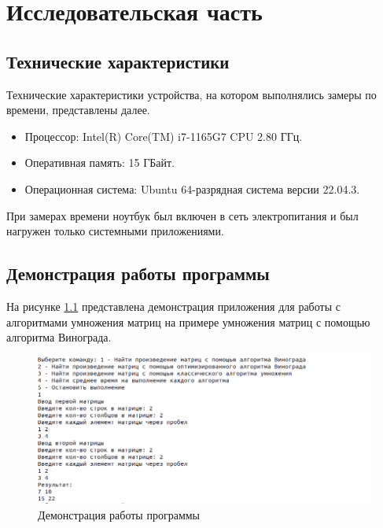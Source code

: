 \chapter{Исследовательская часть}

\section{Технические характеристики}

Технические характеристики устройства, на котором выполнялись замеры по времени, представлены далее.

\begin{itemize}
	\item Процессор: Intel(R) Core(TM) i7-1165G7 CPU 2.80 ГГц.
	\item Оперативная память: 15 ГБайт.
	\item Операционная система: Ubuntu 64-разрядная система версии 22.04.3.
\end{itemize}

При замерах времени ноутбук был включен в сеть электропитания и был нагружен только системными приложениями.

\clearpage

\section{Демонстрация работы программы}

На рисунке \ref{img:demonstration} представлена демонстрация приложения для работы с алгоритмами умножения матриц на примере умножения матриц с помощью алгоритма Винограда.

\begin{figure}[h]
	\centering
	\includegraphics[width=\textwidth]{img/example.png}
	\caption{Демонстрация работы программы}
	\label{img:demonstration}
\end{figure}

\clearpage

